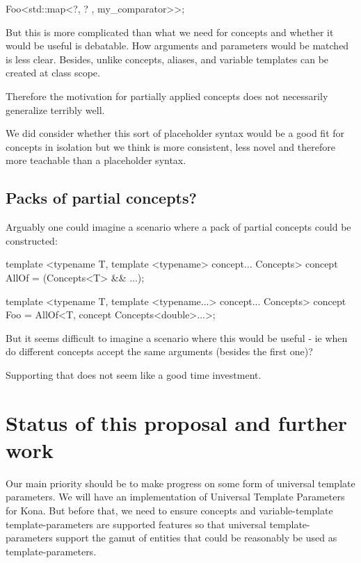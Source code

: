 \documentclass{wg21}
\begin{document}
\begin{colorblock}
Foo<std::map<?, ? , my_comparator>>;
\end{colorblock}

But this is more complicated than what we need for concepts and whether it would be useful is debatable.
How arguments and parameters would be matched is less clear.
Besides, unlike concepts, aliases, and variable templates can be created at class scope.

Therefore the motivation for partially applied concepts does not necessarily generalize terribly well.

We did consider whether this sort of placeholder syntax would be a good fit for concepts in isolation but
we think  is more consistent, less novel and
therefore more teachable than a placeholder syntax.

\subsection{Packs of partial concepts?}

Arguably one could imagine a scenario where a pack of partial concepts could be constructed:

\begin{colorblock}
template <typename T, template <typename> concept... Concepts>
concept AllOf  = (Concepts<T> && ...);

template <typename T, template <typename...> concept... Concepts>
concept Foo = AllOf<T, concept Concepts<double>...>;
\end{colorblock}

But it seems difficult to imagine a scenario where this would be useful - ie when do different concepts accept the same arguments (besides the first one)?

Supporting that does not seem like a good time investment.

\section{Status of this proposal and further work}

Our main priority should be to make progress on some form of universal template parameters.
We will have an implementation of Universal Template Parameters for Kona.
But before that, we need to ensure concepts and variable-template template-parameters are supported features so that universal
template-parameters support the gamut of entities that could be reasonably be used as template-parameters.
\end{document}
